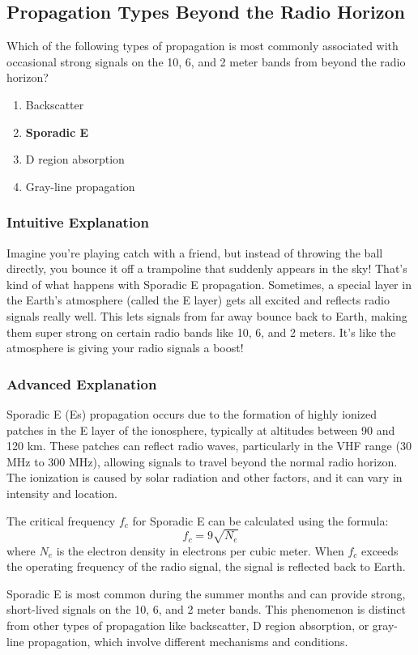 \subsection{Propagation Types Beyond the Radio Horizon}
\label{T3C04}

\begin{tcolorbox}[colback=gray!10!white,colframe=black!75!black,title=T3C04]
Which of the following types of propagation is most commonly associated with occasional strong signals on the 10, 6, and 2 meter bands from beyond the radio horizon?
\begin{enumerate}[label=\Alph*)]
    \item Backscatter
    \item \textbf{Sporadic E}
    \item D region absorption
    \item Gray-line propagation
\end{enumerate}
\end{tcolorbox}

\subsubsection*{Intuitive Explanation}
Imagine you're playing catch with a friend, but instead of throwing the ball directly, you bounce it off a trampoline that suddenly appears in the sky! That's kind of what happens with Sporadic E propagation. Sometimes, a special layer in the Earth's atmosphere (called the E layer) gets all excited and reflects radio signals really well. This lets signals from far away bounce back to Earth, making them super strong on certain radio bands like 10, 6, and 2 meters. It's like the atmosphere is giving your radio signals a boost!

\subsubsection*{Advanced Explanation}
Sporadic E (Es) propagation occurs due to the formation of highly ionized patches in the E layer of the ionosphere, typically at altitudes between 90 and 120 km. These patches can reflect radio waves, particularly in the VHF range (30 MHz to 300 MHz), allowing signals to travel beyond the normal radio horizon. The ionization is caused by solar radiation and other factors, and it can vary in intensity and location.

The critical frequency \( f_c \) for Sporadic E can be calculated using the formula:
\[
f_c = 9 \sqrt{N_e}
\]
where \( N_e \) is the electron density in electrons per cubic meter. When \( f_c \) exceeds the operating frequency of the radio signal, the signal is reflected back to Earth.

Sporadic E is most common during the summer months and can provide strong, short-lived signals on the 10, 6, and 2 meter bands. This phenomenon is distinct from other types of propagation like backscatter, D region absorption, or gray-line propagation, which involve different mechanisms and conditions.

